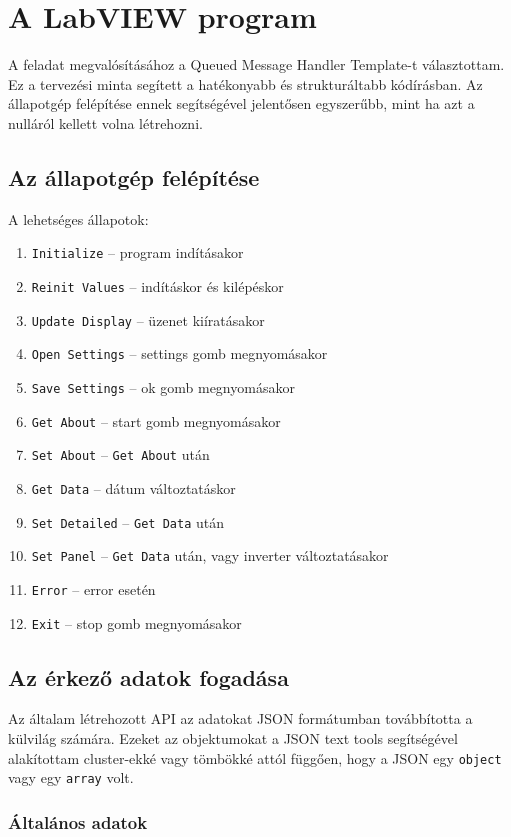\chapter{A LabVIEW program}

A feladat megvalósításához a Queued Message Handler Template-t választottam.
Ez a tervezési minta segített a hatékonyabb és strukturáltabb kódírásban.
Az állapotgép felépítése ennek segítségével jelentősen egyszerűbb, mint
ha azt a nulláról kellett volna létrehozni.

\section{Az állapotgép felépítése}

A lehetséges állapotok:
\newcommand{\alma}[1]{\item \texttt{#1}}
\begin{enumerate}
  \alma{Initialize} -- program indításakor
  \alma{Reinit Values} -- indításkor és kilépéskor
  \alma{Update Display} -- üzenet kiíratásakor
  \alma{Open Settings} -- settings gomb megnyomásakor
  \alma{Save Settings} -- ok gomb megnyomásakor
  \alma{Get About} -- start gomb megnyomásakor
  \alma{Set About} -- \texttt{Get About} után
  \alma{Get Data} -- dátum változtatáskor
  \alma{Set Detailed} -- \texttt{Get Data} után
  \alma{Set Panel} -- \texttt{Get Data} után, vagy inverter változtatásakor
  \alma{Error} -- error esetén
  \alma{Exit} -- stop gomb megnyomásakor
\end{enumerate}

\section{Az érkező adatok fogadása}

Az általam létrehozott API az adatokat JSON formátumban továbbította a
külvilág számára. Ezeket az objektumokat a JSON text tools segítségével
alakítottam cluster-ekké vagy tömbökké attól függően, hogy a JSON egy
\texttt{object} vagy egy \texttt{array} volt.

\subsection{Általános adatok}

